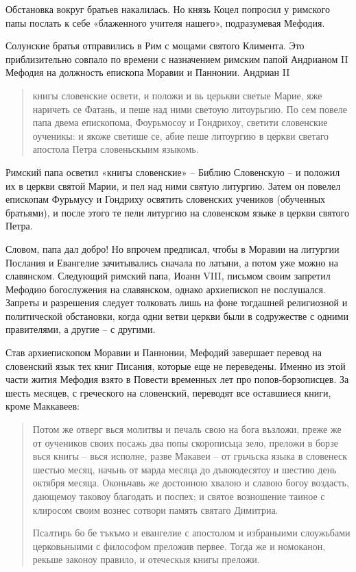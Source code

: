 Обстановка вокруг братьев накалилась. Но князь Коцел попросил у римского папы послать к себе «блаженного учителя нашего», подразумевая Мефодия.

Солунские братья отправились в Рим с мощами святого Климента. Это приблизительно совпало по времени с назначением римским папой Андрианом II Мефодия на должность епископа Моравии и Паннонии. Андриан II

\begin{quotation}
книгы словенские освети, и положи и вь церькви светые Марие, яже наричеть се Фатань, и пеше над ними светоую литоурьгию. По сем повеле папа двема епископома, Фоурьмосоу и Гондрихоу, светити словенские оученикы: и якоже светише се, абие пеше литоургию в церкви светаго апостола Петра словеньскыим языкомь.
\end{quotation}

Римский папа осветил «книгы словенские» –  Библию Словенскую – и положил их в церкви святой Марии, и пел над ними святую литургию. Затем он повелел епископам Фурьмусу и Гондриху освятить словенских учеников (обученных братьями), и после этого те пели литургию на словенском языке в церкви святого Петра.

Словом, папа дал добро! Но впрочем предписал, чтобы в Моравии на литургии Послания и Евангелие зачитывались сначала по латыни, а потом уже можно на славянском. Следующий римский папа, Иоанн VIII, письмом своим запретил Мефодию богослужения на славянском, однако архиепископ не послушался. Запреты и разрешения следует толковать лишь на фоне тогдашней религиозной и политической обстановки, когда одни ветви церкви были в содружестве с одними правителями, а другие – с другими.

Став архиепископом Моравии и Паннонии, Мефодий завершает перевод на словенский язык тех книг Писания, которые еще не переведены. Именно из этой части жития Мефодия взято в Повести временных лет про попов-борзописцев. За шесть месяцев, с греческого на словенский, переводят все оставшиеся книги, кроме Маккавеев: 

\begin{quotation}
Потом же отверг вься молитвы и печаль свою на бога възложи, преже же от оучеников своих посажь два попы скорописьца зело, преложи в борзе вься книгы – вься исполне, разве Макавеи – от грьчьска языка в словенеск шестью месяц, начьнь от марда месяца до дъвоюдесятоу и шестию день октября месяца. Оконьчавь же достоиною хвалою и славою богоу воздасть, дающемоу таковоу благодать и поспех; и святое возношение таиное с клиросом своим вознес сотвори память святаго Димитриа.

Псалтирь бо бе тъкъмо и евангелие с апостолом и избраныими слоужьбами церковьныими с философом преложив первее. Тогда же и номоканон, рекьше законоу правило, и отеческыя книгы преложи.
\end{quotation}

